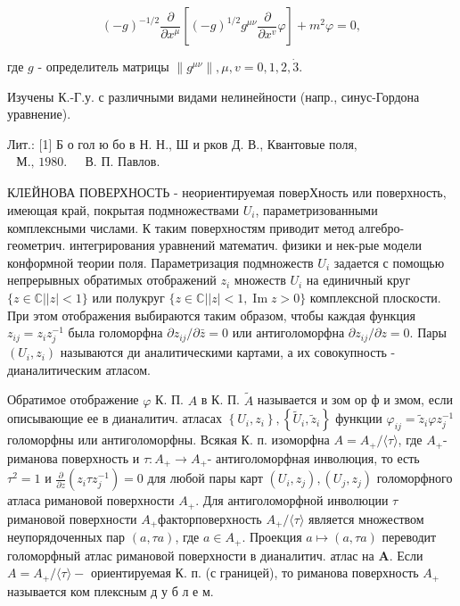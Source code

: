 \documentclass[10pt]{article}
\begin{document}
\[

(-g)^{-1 / 2} \frac{\partial}{\partial x^{\mu}}\left[(-g)^{1 / 2} g^{\mu \nu} \frac{\partial}{\partial x^{v}} \varphi\right]+m^{2} \varphi=0,

\]



где $g$ - определитель матрицы $\left\|g^{\mu \nu}\right\|, \mu, v=0,1,2, \dot{3}$.



Изучены К.-Г.у. с различными видами нелинейности (напр., синус-Гордона уравнение).



Лит.: [1] Б о гол ю бо в Н. Н., Ш и рков Д. В., Квантовые поля, $\begin{array}{ll}\text { М., 1980. } & \text { В. П. Павлов. }\end{array}$



КЛЕЙНОВА ПОВЕРХНОСТЬ - неориентируемая поверХность или поверхность, имеющая край, покрытая подмножествами $U_{i}$, параметризованными комплексными числами. К таким поверхностям приводит метод алгебро-геометрич. интегрирования уравнений математич. физики и нек-рые модели конформной теории поля. Параметризация подмножеств $U_{i}$ задается с помощью непрерывных обратимых отображений $z_{i}$ множеств $U_{i}$ на единичный круг $\{z \in \mathbb{C}|| z \mid<1\}$ или полукруг $\{z \in \mathbb{C}|| z \mid<1, \operatorname{Im} z>0\}$ комплексной плоскости. При этом отображения выбираются таким образом, чтобы каждая функция $z_{i j}=z_{i} z_{j}^{-1}$ была голоморфна $\partial z_{i j} / \partial \bar{z}=0$ или антиголоморфна $\partial z_{i j} / \partial z=0$. Пары $\left(U_{i}, z_{i}\right)$ называются ди аналитическими картами, а их совокупность - дианалитическим атласом.



Обратимое отображение $\varphi$ К. П. $A$ в К. П. $\tilde{A}$ называется и зом ор ф и змом, если описывающие ее в дианалитич. атласах $\left\{U_{i}, z_{i}\right\},\left\{\widetilde{U}_{i}, \tilde{z}_{i}\right\}$ функции $\varphi_{i j}=\widetilde{z}_{i} \varphi z_{j}^{-1}$ голоморфны или антиголоморфны. Всякая К. п. изоморфна $A=A_{+} /\langle\tau\rangle$, где $A_{+}$- риманова поверхность и $\tau: A_{+} \rightarrow A_{+}$- антиголоморфная инволюция, то есть $\tau^{2}=1$ и $\frac{\partial}{\partial z}\left(z_{i} \tau z_{j}^{-1}\right)=0$ для любой пары карт $\left(U_{i}, z_{j}\right),\left(U_{j}, z_{j}\right)$ голоморфного атласа римановой поверхности $A_{+}$. Для антиголоморфной инволюции $\tau$ римановой поверхности $A_{+}$факторповерхность $A_{+} /\langle\tau\rangle$ является множеством неупорядоченных пар $(a, \tau a)$, где $a \in A_{+}$. Проекция $a \mapsto(a, \tau a)$ переводит голоморфный атлас римановой поверхности в дианалитич. атлас на $\boldsymbol{A}$. Если $A=A_{+} /\langle\tau\rangle-$ ориентируемая К. п. (с границей), то риманова поверхность $A_{+}$называется ком плексным д у б л е м.
\end{document}
